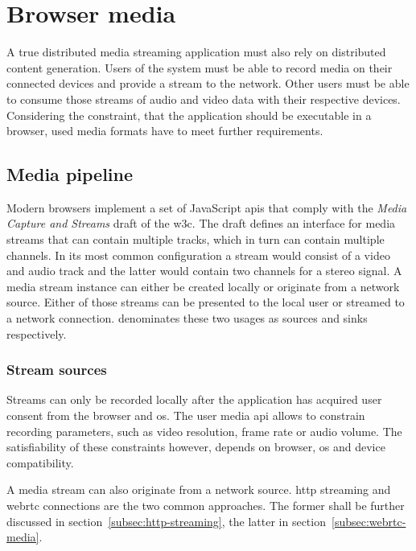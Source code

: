 \section{Browser media}

A true distributed media streaming application must also rely on distributed content generation. Users of the system must be able to record media on their connected devices and provide a stream to the network. Other users must be able to consume those streams of audio and video data with their respective devices. Considering the constraint, that the application should be executable in a browser, used media formats have to meet further requirements.

\subsection{Media pipeline}
\label{browser-api}

Modern browsers implement a set of JavaScript \glspl{api} that comply with the {\textit{Media Capture and Streams}} draft \cite{media-capture-and-streams} of the \gls{w3c}. The draft defines an interface for media streams that can contain multiple tracks, which in turn can contain multiple channels. In its most common configuration a stream would consist of a video and audio track and the latter would contain two channels for a stereo signal. A media stream instance can either be created locally or originate from a network source. Either of those streams can be presented to the local user or streamed to a network connection. \cite{media-capture-and-streams} denominates these two usages as sources and sinks respectively.

\subsubsection{Stream sources}

Streams can only be recorded locally after the application has acquired user consent from the browser and \gls{os}. The user media \gls{api} allows to constrain recording parameters, such as video resolution, frame rate or audio volume. The satisfiability of these constraints however, depends on browser, \gls{os} and device compatibility.


A media stream can also originate from a network source. \Gls{http} streaming and \gls{webrtc} connections are the two common approaches. The former shall be further discussed in section~\ref{subsec:http-streaming}, the latter in section~\ref{subsec:webrtc-media}.

